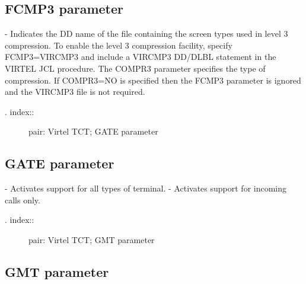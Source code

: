 \documentclass[letterpaper,10pt,english]{sphinxmanual}
\begin{document}
\subsection{FCMP3 parameter}
\label{\detokenize{Installation_Guide:fcmp3-parameter}}
\begin{sphinxVerbatim}[commandchars=\\\{\}]
 
\end{sphinxVerbatim}

 - Indicates the DD name of the file containing the screen types used in level 3 compression. To enable the level 3 compression facility, specify FCMP3=VIRCMP3 and include a VIRCMP3 DD/DLBL statement in the VIRTEL JCL procedure. The COMPR3 parameter specifies the type of compression. If COMPR3=NO is specified then the FCMP3 parameter is ignored and the VIRCMP3 file is not required.
\begin{description}
\item[{. index::}] \leavevmode
pair: Virtel TCT; GATE parameter

\end{description}


\subsection{GATE parameter}
\label{\detokenize{Installation_Guide:gate-parameter}}
\begin{sphinxVerbatim}[commandchars=\\\{\}]
 
\end{sphinxVerbatim}

 - Activates support for all types of terminal.
 - Activates support for incoming calls only.
\begin{description}
\item[{. index::}] \leavevmode
pair: Virtel TCT; GMT parameter

\end{description}


\subsection{GMT parameter}
\label{\detokenize{Installation_Guide:gmt-parameter}}
\begin{sphinxVerbatim}[commandchars=\\\{\}]
 
\end{sphinxVerbatim}
\end{document}
